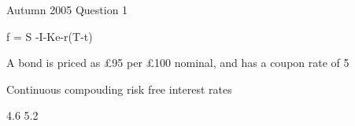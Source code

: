  
Autumn 2005 Question 1
 
f = S -I-Ke-r(T-t)
 
A bond is priced as £95 per £100 nominal, and has a coupon rate of 5%
 
Continuous compouding risk free interest rates
 
4.6%
5.2%
